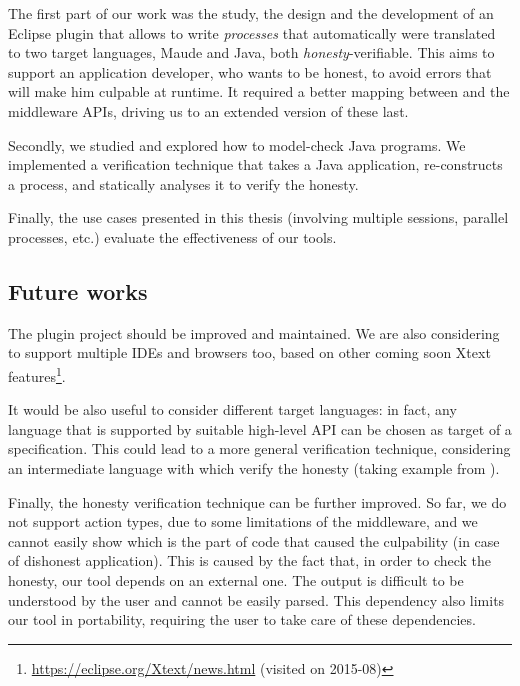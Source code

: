 The first part of our work was the study, the design and the development of an Eclipse plugin that allows to write \textit{\coco processes} that automatically were translated to two target languages, Maude and Java, both \textit{honesty}-verifiable. This aims to support an application developer, who wants to be honest, to avoid errors that will make him culpable at runtime.
It required a better mapping between \coco and the middleware APIs, driving us to an extended version of these last.

Secondly, we studied and explored how to model-check Java programs. We implemented a verification technique that takes a Java application, re-constructs a \coco process, and statically analyses it to verify the honesty.

Finally, the use cases presented in this thesis (involving multiple sessions, parallel processes, etc.) evaluate the effectiveness of our tools.

\subsection*{Future works}
The plugin project should be improved and maintained. We are also considering to support multiple IDEs and browsers too, based on other coming soon Xtext features\footnote{\url{https://eclipse.org/Xtext/news.html} (visited on 2015-08)}.


It would be also useful to consider different \coco target languages: in fact, any language that is supported by suitable high-level API can be chosen as target of a \coco specification. 
This could lead to a more general verification technique, considering an intermediate language with which verify the honesty (taking example from \cite{juhaszviper}).

Finally, the honesty verification technique can be further improved. So far, we do not support action types, due to some limitations of the middleware, and 
we cannot easily show which is the part of code that caused the culpability (in case of dishonest application). 
This is caused by the fact that, in order to check the honesty, our tool depends on an external one. The output is difficult to be understood by the user and cannot be easily parsed. 
This dependency also limits our tool in portability, requiring the user to take care of these dependencies.

